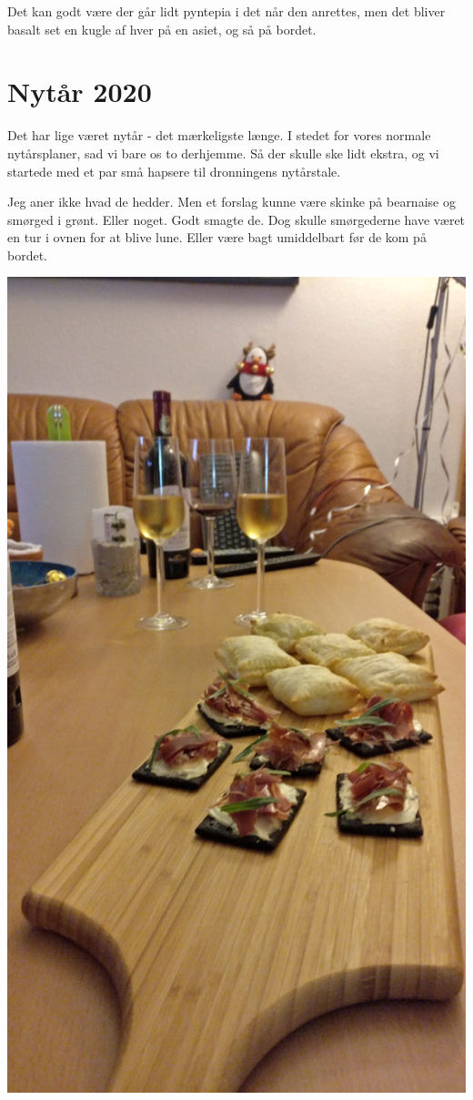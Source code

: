 \documentclass[
]{book}
\begin{document}
Det kan godt være der går lidt pyntepia i det når den anrettes, men det bliver basalt set en kugle af hver på en asiet, og så på bordet.

\hypertarget{nytuxe5r-2020}{%
\section{Nytår 2020}\label{nytuxe5r-2020}}

Det har lige været nytår - det mærkeligste længe. I stedet for vores normale nytårsplaner, sad vi bare os to derhjemme. Så der skulle ske lidt ekstra, og vi startede med et par små hapsere til dronningens nytårstale.

Jeg aner ikke hvad de hedder. Men et forslag kunne være skinke på bearnaise og smørged i grønt. Eller noget. Godt smagte de. Dog skulle smørgederne have været en tur i ovnen for at blive lune. Eller være bagt umiddelbart før de kom på bordet.

\includegraphics{images/snacks-scaled.jpg}
\end{document}
